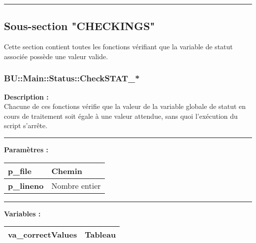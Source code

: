 \documentclass[a4paper,10pt]{article}
\begin{document}
\color{green}\par\noindent\rule{\textwidth}{0.4pt}\color{white}

\color{green}
\subsection{Sous-section "CHECKINGS"}\color{white}

\begin{justify}
    Cette section contient toutes les fonctions vérifiant que la variable de statut associée possède une valeur valide.
\end{justify}

\color{blue}
\subsubsection{BU::Main::Status::CheckSTAT\_*}\color{white}

\begin{justify}
    \textbf{Description :}\\[1\baselineskip]
    Chacune de ces fonctions vérifie que la valeur de la variable globale de statut en cours de traitement soit égale à une valeur attendue, sans quoi l'exécution du script s'arrête.
\end{justify}\setlength{\parskip}{1em}


\par\noindent\rule{\textwidth}{0.4pt}

\begin{justify}
    \textbf{Paramètres :}\\[1\baselineskip]
    \begin{tabular}{|l|l|}
        \hline
        \textbf{\color{orange}p\_file} & Chemin\\
        \hline
        \textbf{\color{orange}p\_lineno} & Nombre entier\\
        \hline
    \end{tabular}
\end{justify}


\par\noindent\rule{\textwidth}{0.4pt}

\begin{justify}
    \textbf{Variables :}\\[1\baselineskip]
    \begin{tabular}{|l|l|}
        \hline
        \textbf{\color{orange}va\_correctValues} & Tableau\\
        \hline
    \end{tabular}
\end{justify}
\end{document}
